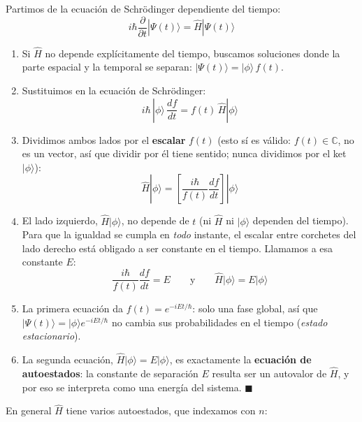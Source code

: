 \documentclass[12pt]{article}
\begin{document}
\begin{ejemplo}[title=\textbf{Demostración: de Schrödinger a la ecuación de autoestados}]
Partimos de la ecuación de Schrödinger dependiente del tiempo:
\[
i\hbar \frac{\partial}{\partial t}|\Psi(t)\rangle = \hat{H} |\Psi(t)\rangle
\]

\begin{enumerate}
    \item Si $\hat{H}$ no depende explícitamente del tiempo, buscamos
    soluciones donde la parte espacial y la temporal se separan:
    $|\Psi(t)\rangle = |\phi\rangle \, f(t)$.

    \item Sustituimos en la ecuación de Schrödinger:
    \[
    i\hbar \, |\phi\rangle \, \frac{df}{dt} = f(t) \, \hat{H} |\phi\rangle
    \]

    \item Dividimos ambos lados por el \textbf{escalar} $f(t)$ (esto sí es
    válido: $f(t) \in \mathbb{C}$, no es un vector, así que dividir por él
    tiene sentido; nunca dividimos por el ket $|\phi\rangle$):
    \[
    \hat{H} |\phi\rangle = \left[\frac{i\hbar}{f(t)}\frac{df}{dt}\right]
    |\phi\rangle
    \]

    \item El lado izquierdo, $\hat{H}|\phi\rangle$, no depende de $t$
    (ni $\hat{H}$ ni $|\phi\rangle$ dependen del tiempo). Para que la
    igualdad se cumpla en \textit{todo} instante, el escalar entre
    corchetes del lado derecho está obligado a ser constante en el tiempo.
    Llamamos a esa constante $E$:
    \[
    \frac{i\hbar}{f(t)}\frac{df}{dt} = E
    \qquad \text{y} \qquad
    \hat{H} |\phi\rangle = E |\phi\rangle
    \]

    \item La primera ecuación da $f(t) = e^{-iEt/\hbar}$: solo una fase
    global, así que $|\Psi(t)\rangle = |\phi\rangle e^{-iEt/\hbar}$ no
    cambia sus probabilidades en el tiempo (\textit{estado estacionario}).

    \item La segunda ecuación, $\hat{H}|\phi\rangle = E|\phi\rangle$, es
    exactamente la \textbf{ecuación de autoestados}: la constante de
    separación $E$ resulta ser un autovalor de $\hat{H}$, y por eso se
    interpreta como una energía del sistema. $\blacksquare$
\end{enumerate}
\end{ejemplo}

En general $\hat{H}$ tiene varios autoestados, que indexamos con $n$:
\end{document}

